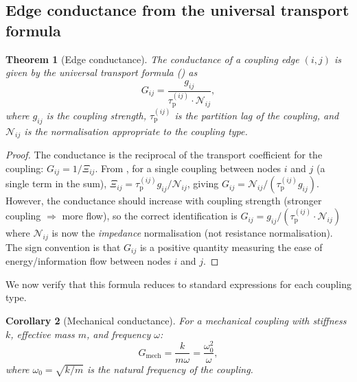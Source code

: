 \documentclass[twocolumn,10pt,a4paper]{article}
\newtheorem{theorem}{Theorem}[section]
\newtheorem{corollary}[theorem]{Corollary}
\theoremstyle{definition}
\theoremstyle{remark}
\newcommand{\tauP}{\tau_{\mathrm{p}}}
\begin{document}
\subsection{Edge conductance from the universal transport formula}

\begin{theorem}[Edge conductance]\label{thm:edge_conductance}
The conductance of a coupling edge $(i, j)$ is given by the universal transport formula () as
\begin{equation}\label{eq:edge_conductance}
G_{ij} = \frac{g_{ij}}{\tauP^{(ij)} \cdot \mathcal{N}_{ij}},
\end{equation}
where $g_{ij}$ is the coupling strength, $\tauP^{(ij)}$ is the partition lag of the coupling, and $\mathcal{N}_{ij}$ is the normalisation appropriate to the coupling type.
\end{theorem}

\begin{proof}
The conductance is the reciprocal of the transport coefficient for the coupling: $G_{ij} = 1/\Xi_{ij}$. From , for a single coupling between nodes $i$ and $j$ (a single term in the sum), $\Xi_{ij} = \tauP^{(ij)} g_{ij} / \mathcal{N}_{ij}$, giving $G_{ij} = \mathcal{N}_{ij} / (\tauP^{(ij)} g_{ij})$. However, the conductance should increase with coupling strength (stronger coupling $\Rightarrow$ more flow), so the correct identification is $G_{ij} = g_{ij} / (\tauP^{(ij)} \cdot \mathcal{N}_{ij})$ where $\mathcal{N}_{ij}$ is now the \emph{impedance} normalisation (not resistance normalisation). The sign convention is that $G_{ij}$ is a positive quantity measuring the ease of energy/information flow between nodes $i$ and $j$.
\end{proof}

We now verify that this formula reduces to standard expressions for each coupling type.

\begin{corollary}[Mechanical conductance]\label{cor:mech_cond}
For a mechanical coupling with stiffness $k$, effective mass $m$, and frequency $\omega$:
\begin{equation}\label{eq:mech_conductance}
G_{\mathrm{mech}} = \frac{k}{m\omega} = \frac{\omega_0^2}{\omega},
\end{equation}
where $\omega_0 = \sqrt{k/m}$ is the natural frequency of the coupling.
\end{corollary}
\end{document}
